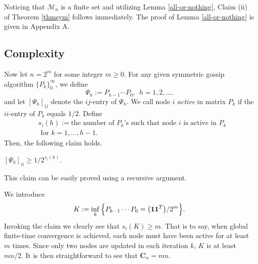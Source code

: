 \documentclass[a4paper, 11pt]{article}
\begin{document}
Noticing that $ \mathscr{M}_n$ is a finite set and utilizing  Lemma \ref{all-or-nothing}, Claim (ii) of Theorem \ref{thmsym} follows immediately. The proof of Lemma \ref{all-or-nothing} is given in Appendix A.









\subsection{Complexity}
Now let $n=2^m$ for some integer $m\geq 0$. For any given symmetric  gossip algorithm $\{P_k\}_0^{\infty}$, we define
$$
\Psi_h:=P_{h-1}\cdots P_0, \ \ h=1, 2, \dots.
$$
and let $[\Psi_h]_{ij}$ denote the $ij$-entry of $\Psi_h$. We call node $i$ {\em active} in matrix $P_k$ if the $ii$-entry of $P_k$ equals $1/2$. Define
\begin{align*}
& s_{i}(h):=\mbox{the number of $P_k$'s such that node $i$ is active in $P_k$}\\
&\mbox{ for $k=1,\dots,h-1$. }
\end{align*}
Then, the following claim holds.

\vspace{2mm}

   $[\Psi_h]_{ii} \geq {1}/{2^{s_{i}(h)}}$.

\vspace{2mm}

This claim can be easily proved using a recursive argument.

We introduce
$$
K:=\inf_k \Big\{ P_{k-1}\cdots P_0= \big({\bf{1}} {\bf{1}}^T\big)/2^m \Big\}.
$$
Invoking the claim we clearly see that $s_{i}(K)\geq m$. That is to say, when global finite-time convergence is achieved,  each node must have been active for at least $m$ times. Since only two nodes are updated in each iteration $k$,  $K$ is at least $mn/2$. It is then straightforward to see that $\mathbf{C}_n =m n$.
\end{document}
